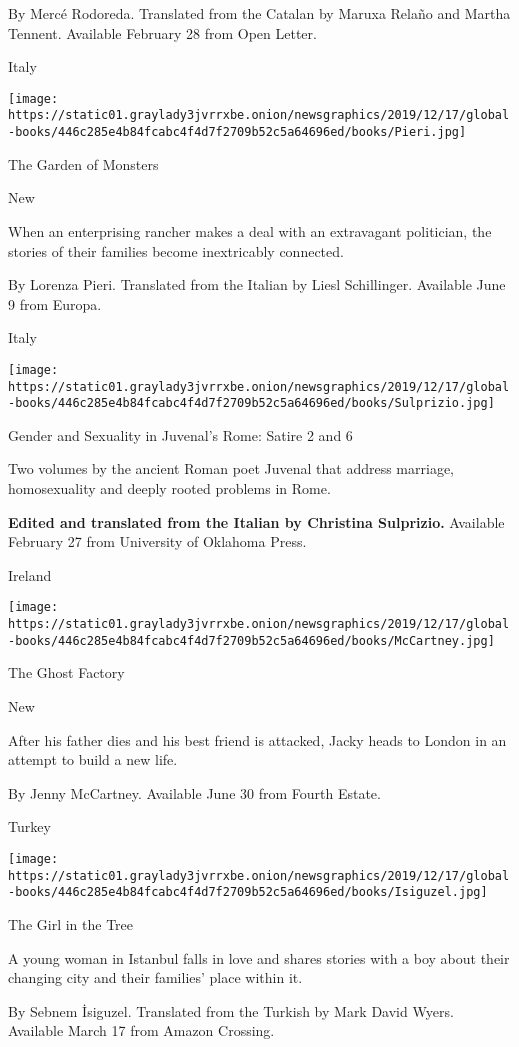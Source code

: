  By Mercé Rodoreda. Translated from the Catalan by Maruxa Relaño and
Martha Tennent. Available February 28 from Open Letter.

Italy

\texttt{[image: https://static01.graylady3jvrrxbe.onion/newsgraphics/2019/12/17/global-books/446c285e4b84fcabc4f4d7f2709b52c5a64696ed/books/Pieri.jpg]}

The Garden of Monsters

New

When an enterprising rancher makes a deal with an extravagant
politician, the stories of their families become inextricably connected.

 By Lorenza Pieri. Translated from the Italian by Liesl Schillinger.
Available June 9 from Europa.

Italy

\texttt{[image: https://static01.graylady3jvrrxbe.onion/newsgraphics/2019/12/17/global-books/446c285e4b84fcabc4f4d7f2709b52c5a64696ed/books/Sulprizio.jpg]}

Gender and Sexuality in Juvenal's Rome: Satire 2 and 6

Two volumes by the ancient Roman poet Juvenal that address marriage,
homosexuality and deeply rooted problems in Rome.

 \textbf{Edited and translated from the Italian by Christina Sulprizio.}
Available February 27 from University of Oklahoma Press.

Ireland

\texttt{[image: https://static01.graylady3jvrrxbe.onion/newsgraphics/2019/12/17/global-books/446c285e4b84fcabc4f4d7f2709b52c5a64696ed/books/McCartney.jpg]}

The Ghost Factory

New

After his father dies and his best friend is attacked, Jacky heads to
London in an attempt to build a new life.

 By Jenny McCartney. Available June 30 from Fourth Estate.

Turkey

\texttt{[image: https://static01.graylady3jvrrxbe.onion/newsgraphics/2019/12/17/global-books/446c285e4b84fcabc4f4d7f2709b52c5a64696ed/books/Isiguzel.jpg]}

The Girl in the Tree

A young woman in Istanbul falls in love and shares stories with a boy
about their changing city and their families' place within it.

 By Sebnem İsiguzel. Translated from the Turkish by Mark David Wyers.
Available March 17 from Amazon Crossing.

